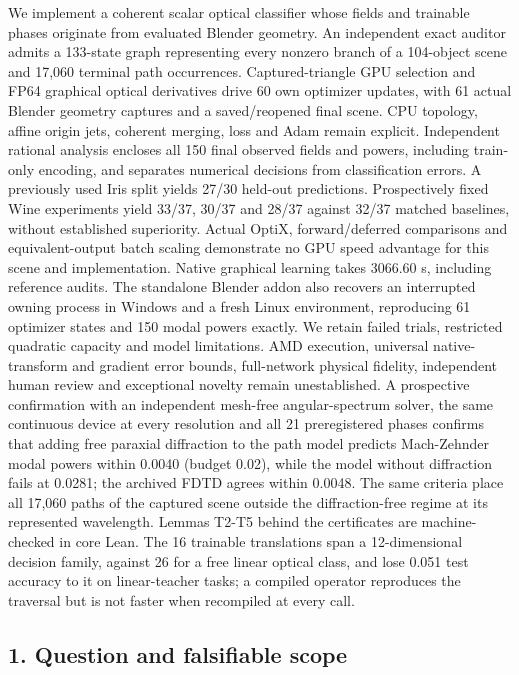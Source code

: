 \documentclass[
  10pt,
]{article}
\begin{document}
We implement a coherent scalar optical classifier whose fields and
trainable phases originate from evaluated Blender geometry. An
independent exact auditor admits a 133-state graph representing every
nonzero branch of a 104-object scene and 17,060 terminal path
occurrences. Captured-triangle GPU selection and FP64 graphical optical
derivatives drive 60 own optimizer updates, with 61 actual Blender
geometry captures and a saved/reopened final scene. CPU topology, affine
origin jets, coherent merging, loss and Adam remain explicit.
Independent rational analysis encloses all 150 final observed fields and
powers, including train-only encoding, and separates numerical decisions
from classification errors. A previously used Iris split yields 27/30
held-out predictions. Prospectively fixed Wine experiments yield 33/37,
30/37 and 28/37 against 32/37 matched baselines, without established
superiority. Actual OptiX, forward/deferred comparisons and
equivalent-output batch scaling demonstrate no GPU speed advantage for
this scene and implementation. Native graphical learning takes 3066.60
s, including reference audits. The standalone Blender addon also
recovers an interrupted owning process in Windows and a fresh Linux
environment, reproducing 61 optimizer states and 150 modal powers
exactly. We retain failed trials, restricted quadratic capacity and
model limitations. AMD execution, universal native-transform and
gradient error bounds, full-network physical fidelity, independent human
review and exceptional novelty remain unestablished. A prospective
confirmation with an independent mesh-free angular-spectrum solver, the
same continuous device at every resolution and all 21 preregistered
phases confirms that adding free paraxial diffraction to the path model
predicts Mach-Zehnder modal powers within 0.0040 (budget 0.02), while
the model without diffraction fails at 0.0281; the archived FDTD agrees
within 0.0048. The same criteria place all 17,060 paths of the captured
scene outside the diffraction-free regime at its represented wavelength.
Lemmas T2-T5 behind the certificates are machine-checked in core Lean.
The 16 trainable translations span a 12-dimensional decision family,
against 26 for a free linear optical class, and lose 0.051 test accuracy
to it on linear-teacher tasks; a compiled operator reproduces the
traversal but is not faster when recompiled at every call.

\hypertarget{question-and-falsifiable-scope}{%
\subsection{1. Question and falsifiable
scope}\label{question-and-falsifiable-scope}}
\end{document}
